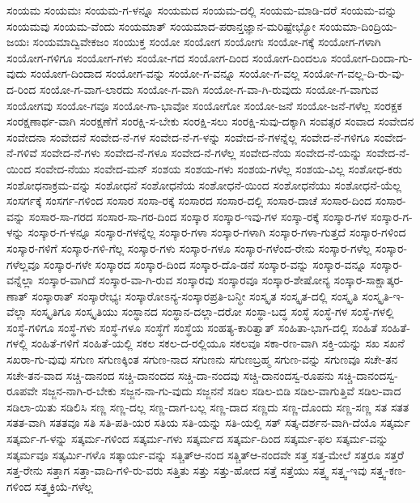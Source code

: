 {ಸಂಯಮ
ಸಂಯಮಃ
ಸಂಯಮ-ಗ-ಳನ್ನೂ
ಸಂಯಮದ
ಸಂಯಮ-ದಲ್ಲಿ
ಸಂಯಮ-ಮಾಡಿ-ದರೆ
ಸಂಯಮ-ವನ್ನು
ಸಂಯಮವು
ಸಂಯಮ-ವೆಂದು
ಸಂಯಮಾತ್
ಸಂಯಮಾದ-ಪರಾನ್ತಜ್ಞಾನ-ಮರಿಷ್ಟೇಭ್ಯೋ
ಸಂಯಮಾ-ದಿಂದ್ರಿಯ-ಜಯಃ
ಸಂಯಮಾದ್ವಿವೇಕಜಂ
ಸಂಯುಕ್ತ
ಸಂಯೋ
ಸಂಯೋಗ
ಸಂಯೋಗಃ
ಸಂಯೋ-ಗಕ್ಕೆ
ಸಂಯೋಗ-ಗಳಾಗಿ
ಸಂಯೋಗ-ಗಳಿಗೂ
ಸಂಯೋಗ-ಗಳು
ಸಂಯೋ-ಗದ
ಸಂಯೋಗ-ದಿಂದ
ಸಂಯೋಗ-ದಿಂದಲೂ
ಸಂಯೋಗ-ದಿಂದಾ-ಗು-ವುದು
ಸಂಯೋಗ-ದಿಂದಾದ
ಸಂಯೋಗ-ವನ್ನು
ಸಂಯೋ-ಗ-ವನ್ನೂ
ಸಂಯೋ-ಗ-ವಲ್ಲ
ಸಂಯೋ-ಗ-ವಲ್ಲ-ದಿ-ರು-ವು-ದ-ರಿಂದ
ಸಂಯೋ-ಗ-ವಾಗ-ಲಾರದು
ಸಂಯೋ-ಗ-ವಾಗಿ
ಸಂಯೋ-ಗ-ವಾ-ಗಿ-ರುವುದು
ಸಂಯೋ-ಗ-ವಾಗುವ
ಸಂಯೋಗವು
ಸಂಯೋ-ಗವೂ
ಸಂಯೋ-ಗಾ-ಭಾವೋ
ಸಂಯೋಗೋ
ಸಂಯೋ-ಜನೆ
ಸಂಯೋ-ಜನೆ-ಗಳೆಲ್ಲ
ಸಂರಕ್ಷಕ
ಸಂರಕ್ಷಣಾರ್ಥ-ವಾಗಿ
ಸಂರಕ್ಷಣೆಗೆ
ಸಂರಕ್ಷಿ-ಸ-ಬೇಕು
ಸಂರಕ್ಷಿ-ಸಲು
ಸಂರಕ್ಷಿ-ಸುವು-ದಕ್ಕಾಗಿ
ಸಂವತ್ಸರ
ಸಂವಾದ
ಸಂವೇದನ
ಸಂವೇದನಾ
ಸಂವೇದನೆ
ಸಂವೇದ-ನೆ-ಗಳ
ಸಂವೇದ-ನೆ-ಗ-ಳನ್ನು
ಸಂವೇದ-ನೆ-ಗಳನ್ನೆಲ್ಲ
ಸಂವೇದ-ನೆ-ಗಳಿಗೂ
ಸಂವೇದ-ನೆ-ಗಳಿವೆ
ಸಂವೇದ-ನೆ-ಗಳು
ಸಂವೇದ-ನೆ-ಗಳೂ
ಸಂವೇದ-ನೆ-ಗಳೆಲ್ಲ
ಸಂವೇದ-ನೆಯ
ಸಂವೇದ-ನೆ-ಯನ್ನು
ಸಂವೇದ-ನೆ-ಯಿಂದ
ಸಂವೇದ-ನೆಯು
ಸಂವೇದ-ಮನ್
ಸಂಶಯ
ಸಂಶಯ-ಗಳು
ಸಂಶಯ-ಗಳೆಲ್ಲ
ಸಂಶಯ-ವಿಲ್ಲ
ಸಂಶೋಧ-ಕರು
ಸಂಶೋಧನಾಕ್ರಮ-ವನ್ನು
ಸಂಶೋಧನೆ
ಸಂಶೋಧನೆಯ
ಸಂಶೋಧನೆ-ಯಿಂದ
ಸಂಶೋಧನೆಯು
ಸಂಶೋಧನೆ-ಯೆಲ್ಲ
ಸಂಸರ್ಗಕ್ಕೆ
ಸಂಸರ್ಗ-ಗಳಿಂದ
ಸಂಸಾರ
ಸಂಸಾ-ರಕ್ಕೆ
ಸಂಸಾರದ
ಸಂಸಾರ-ದಲ್ಲಿ
ಸಂಸಾರ-ದಾಚೆ
ಸಂಸಾರ-ದಿಂದ
ಸಂಸಾರ-ವನ್ನು
ಸಂಸಾರ-ಸಾ-ಗರದ
ಸಂಸಾರ-ಸಾ-ಗರ-ದಿಂದ
ಸಂಸ್ಕಾರ
ಸಂಸ್ಕಾರ-ಇವು-ಗಳ
ಸಂಸ್ಕಾ-ರಕ್ಕೆ
ಸಂಸ್ಕಾರ-ಗಳ
ಸಂಸ್ಕಾರ-ಗ-ಳನ್ನು
ಸಂಸ್ಕಾರ-ಗ-ಳನ್ನೂ
ಸಂಸ್ಕಾರ-ಗಳನ್ನೆಲ್ಲ
ಸಂಸ್ಕಾರ-ಗಳಾ
ಸಂಸ್ಕಾರ-ಗಳಾಗಿ
ಸಂಸ್ಕಾರ-ಗಳಾ-ಗುತ್ತದೆ
ಸಂಸ್ಕಾರ-ಗಳಿಂದ
ಸಂಸ್ಕಾರ-ಗಳಿಗೆ
ಸಂಸ್ಕಾರ-ಗಳಿ-ಗೆಲ್ಲ
ಸಂಸ್ಕಾರ-ಗಳು
ಸಂಸ್ಕಾರ-ಗಳೂ
ಸಂಸ್ಕಾರ-ಗಳೆಂದ-ರೇನು
ಸಂಸ್ಕಾರ-ಗಳೆಲ್ಲ
ಸಂಸ್ಕಾರ-ಗಳೆಲ್ಲವೂ
ಸಂಸ್ಕಾರ-ಗಳೇ
ಸಂಸ್ಕಾರದ
ಸಂಸ್ಕಾರ-ದಿಂದ
ಸಂಸ್ಕಾರ-ದೊ-ಡನೆ
ಸಂಸ್ಕಾರ-ವನ್ನು
ಸಂಸ್ಕಾರ-ವನ್ನೂ
ಸಂಸ್ಕಾರ-ವನ್ನೆಲ್ಲಾ
ಸಂಸ್ಕಾರ-ವಾಗಿದೆ
ಸಂಸ್ಕಾರ-ವಾ-ಗಿ-ರುವ
ಸಂಸ್ಕಾರವು
ಸಂಸ್ಕಾರವೂ
ಸಂಸ್ಕಾರ-ಶೇಷೋನ್ಯ
ಸಂಸ್ಕಾರ-ಸಾಕ್ಷಾತ್ಕರ-ಣಾತ್
ಸಂಸ್ಕಾರಾತ್
ಸಂಸ್ಕಾರೇಭ್ಯಃ
ಸಂಸ್ಕಾರೋಽನ್ಯ-ಸಂಸ್ಕಾರಪ್ರತಿ-ಬನ್ಧೀ
ಸಂಸ್ಕೃತ
ಸಂಸ್ಕೃತ-ದಲ್ಲಿ
ಸಂಸ್ಕೃತಿ
ಸಂಸ್ಕೃತಿ-ಇ-ವೆಲ್ಲಾ
ಸಂಸ್ಕೃತಿಗೂ
ಸಂಸ್ಕೃತಿಯು
ಸಂಸ್ಥಾನದ
ಸಂಸ್ಥಾನ-ದಲ್ಲಾ-ದರೋ
ಸಂಸ್ಥಾ-ಬದ್ಧ
ಸಂಸ್ಥೆ
ಸಂಸ್ಥೆ-ಗಳ
ಸಂಸ್ಥೆ-ಗಳಲ್ಲಿ
ಸಂಸ್ಥೆ-ಗಳಿಗೂ
ಸಂಸ್ಥೆ-ಗಳು
ಸಂಸ್ಥೆ-ಗಳೂ
ಸಂಸ್ಥೆಗೆ
ಸಂಸ್ಥೆಯ
ಸಂಹತ್ಯ-ಕಾರಿತ್ವಾತ್
ಸಂಹಿತಾ-ಭಾಗ-ದಲ್ಲಿ
ಸಂಹಿತೆ
ಸಂಹಿತೆ-ಗಳಲ್ಲಿ
ಸಂಹಿತೆ-ಗಳಿಗೆ
ಸಂಹಿತೆ-ಯಲ್ಲಿ
ಸಕಲ
ಸಕಲ-ದ-ರಲ್ಲಿಯೂ
ಸಕಲವೂ
ಸಕಾ-ರಣ-ವಾಗಿ
ಸಕ್ತಿ-ಯನ್ನು
ಸಖ
ಸಖನೆ
ಸಖರಾ-ಗು-ವುವು
ಸಗುಣ
ಸಗುಣಕ್ಕಿಂತ
ಸಗುಣ-ನಾದ
ಸಗುಣನು
ಸಗುಣಬ್ರಹ್ಮ
ಸಗುಣ-ವನ್ನು
ಸಗುಣವೂ
ಸಚೇ-ತನ
ಸಚೇ-ತನ-ವಾದ
ಸಚ್ಚಿ-ದಾನಂದ
ಸಚ್ಚಿ-ದಾನಂದದ
ಸಚ್ಚಿ-ದಾ-ನಂದವು
ಸಚ್ಚಿ-ದಾನಂದಸ್ವ-ರೂಪನು
ಸಚ್ಚಿ-ದಾನಂದಸ್ವ-ರೂಪವೇ
ಸಜ್ಜನ-ನಾಗಿ-ರ-ಬೇಕು
ಸಜ್ಜನ-ನಾ-ಗು-ವುದು
ಸಜ್ಜನನೆ
ಸಡಿಲ
ಸಡಿಲ-ಬಿಡಿ
ಸಡಿಲ-ವಾಗುತ್ತಿವೆ
ಸಡಿಲ-ವಾದ
ಸಡಿಲಾ-ಯಿತು
ಸಡಿಲಿಸಿ
ಸಣ್ಣ
ಸಣ್ಣ-ದಲ್ಲ
ಸಣ್ಣ-ದಾಗ-ಬಲ್ಲ
ಸಣ್ಣ-ದಾದ
ಸಣ್ಣದು
ಸಣ್ಣ-ದೊಂದು
ಸಣ್ಣ-ಸಣ್ಣ
ಸತ
ಸತತ
ಸತತ-ವಾಗಿ
ಸತತವೂ
ಸತಿ
ಸತಿ-ಪತಿ-ಯರ
ಸತಿಯ
ಸತಿ-ಯನ್ನು
ಸತಿ-ಯಲ್ಲಿ
ಸತ್
ಸತ್ಕ-ದರ್ಶನ-ವಾಗಿ-ದೆಯೊ
ಸತ್ಕರ್ಮ
ಸತ್ಕರ್ಮ-ಗ-ಳನ್ನು
ಸತ್ಕರ್ಮ-ಗಳಿಂದ
ಸತ್ಕರ್ಮ-ಗಳು
ಸತ್ಕರ್ಮದ
ಸತ್ಕರ್ಮ-ದಿಂದ
ಸತ್ಕರ್ಮ-ಫಲ
ಸತ್ಕರ್ಮ-ವನ್ನು
ಸತ್ಕರ್ಮವೂ
ಸತ್ಕರ್ಮಿ-ಗಳೊ
ಸತ್ಕಾರ್ಯ-ವನ್ನು
ಸತ್ಚಿತ್ಆ-ನಂದ
ಸತ್ಚಿತ್ಆ-ನಂದವೇ
ಸತ್ತ
ಸತ್ತ-ಮೇಲೆ
ಸತ್ತರೂ
ಸತ್ತರೆ
ಸತ್ತ-ರೇನು
ಸತ್ತಾಗ
ಸತ್ತಾ-ವಾದಿ-ಗಳಿ-ರು-ವರು
ಸತ್ತಿತು
ಸತ್ತು
ಸತ್ತು-ಹೋದ
ಸತ್ತೆ
ಸತ್ತೆಯು
ಸತ್ತ್ವ
ಸತ್ತ್ವ-ಇವು
ಸತ್ತ್ವ-ಕಣ-ಗಳಿಂದ
ಸತ್ತ್ವಕ್ರಿಯೆ-ಗಳೆಲ್ಲ
}
